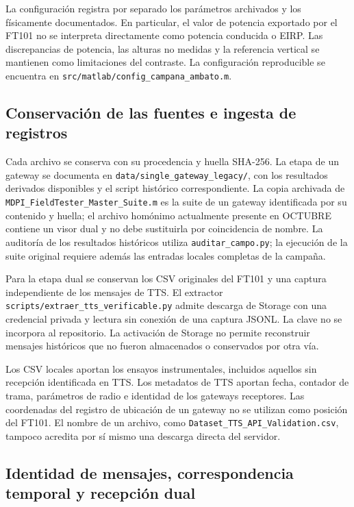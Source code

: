 La configuración registra por separado los parámetros archivados y los físicamente documentados. En particular, el valor de potencia exportado por el FT101 no se interpreta directamente como potencia conducida o EIRP. Las discrepancias de potencia, las alturas no medidas y la referencia vertical se mantienen como limitaciones del contraste. La configuración reproducible se encuentra en \nolinkurl{src/matlab/config_campana_ambato.m}.

\subsection{Conservación de las fuentes e ingesta de registros}

Cada archivo se conserva con su procedencia y huella SHA-256. La etapa de un gateway se documenta en \nolinkurl{data/single_gateway_legacy/}, con los resultados derivados disponibles y el script histórico correspondiente. La copia archivada de \nolinkurl{MDPI_FieldTester_Master_Suite.m} es la suite de un gateway identificada por su contenido y huella; el archivo homónimo actualmente presente en OCTUBRE contiene un visor dual y no debe sustituirla por coincidencia de nombre. La auditoría de los resultados históricos utiliza \nolinkurl{auditar_campo.py}; la ejecución de la suite original requiere además las entradas locales completas de la campaña.

Para la etapa dual se conservan los CSV originales del FT101 y una captura independiente de los mensajes de TTS. El extractor \nolinkurl{scripts/extraer_tts_verificable.py} admite descarga de Storage con una credencial privada y lectura sin conexión de una captura JSONL. La clave no se incorpora al repositorio. La activación de Storage no permite reconstruir mensajes históricos que no fueron almacenados o conservados por otra vía.

Los CSV locales aportan los ensayos instrumentales, incluidos aquellos sin recepción identificada en TTS. Los metadatos de TTS aportan fecha, contador de trama, parámetros de radio e identidad de los gateways receptores. Las coordenadas del registro de ubicación de un gateway no se utilizan como posición del FT101. El nombre de un archivo, como \nolinkurl{Dataset_TTS_API_Validation.csv}, tampoco acredita por sí mismo una descarga directa del servidor.

\subsection{Identidad de mensajes, correspondencia temporal y recepción dual}

